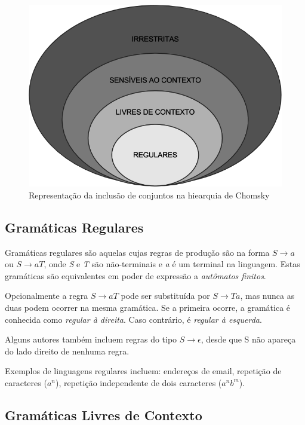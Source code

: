 \documentclass[a4paper,12pt,oneside,onecolumn]{uerj}
\begin{document}
\begin{figure}[!htbp]
  \centering
  \includegraphics[scale=0.5]{figures/chomsky.png}
  \caption{Representação da inclusão de conjuntos na hiearquia de Chomsky}
  \label{fig:chomsky}
\end{figure}

\subsection{Gramáticas Regulares}

Gramáticas regulares são aquelas cujas regras de produção são na forma $S \rightarrow a$ ou $S \rightarrow aT$, onde \emph{S} e \emph{T} são não-terminais e \emph{a} é um terminal na linguagem. Estas gramáticas são equivalentes em poder de expressão a \emph{autômatos finitos}. 

Opcionalmente a regra $S \rightarrow aT$ pode ser substituída por $S \rightarrow Ta$, mas nunca as duas podem ocorrer na mesma gramática. Se a primeira ocorre, a gramática é conhecida como \emph{regular à direita}. Caso contrário, é \emph{regular à esquerda}.

Alguns autores também incluem regras do tipo $S \rightarrow \epsilon$, desde que S não apareça do lado direito de nenhuma regra.

Exemplos de linguagens regulares incluem: endereços de email, repetição de caracteres ($a^n$), repetição independente de dois caracteres ($a^nb^m$).

\subsection{Gramáticas Livres de Contexto}
\end{document}

